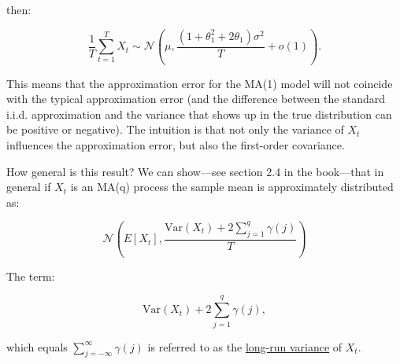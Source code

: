 \documentclass[12] {article}
\begin{document}
\noindent then:

\[ \frac{1}{T} \sum_{t=1}^{T} X_t \sim \mathcal{N} \left( \mu , \frac{(1+\theta_1^2 + 2 \theta_1)\sigma^2}{T} + o(1)\right).\]

This means that the approximation error for the MA(1) model will not coincide with the typical approximation error (and the difference between the standard i.i.d. approximation and the variance that shows up in the true distribution can be positive or negative). The intuition is that not only the variance of $X_t$ influences the approximation error, but also the first-order covariance.

How general is this result? We can show---see section 2.4 in the book---that in general if $X_t$ is an MA(q) process the sample mean is approximately distributed as:

\[ \mathcal{N} \left( E[X_t] , \frac{\textrm{Var}(X_t) + 2 \sum_{j=1}^{q} \gamma(j)} {T} \right) \] 

The term:

 \[ \textrm{Var}(X_t) + 2 \sum_{j=1}^{q} \gamma(j), \]
 
\noindent which equals $\sum_{j=-\infty}^{\infty} \gamma(j)$ is referred to as the \underline{long-run variance} of $X_t$. 
\end{document}

